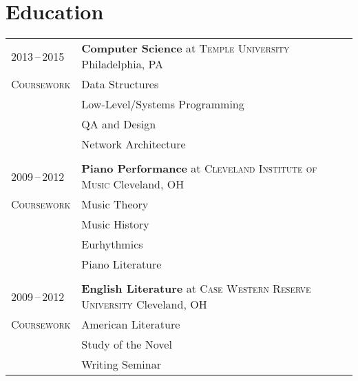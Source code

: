 \documentclass[a4paper,11pt]{article}
\begin{document}

\section{Education}
\begin{tabularx}{\textwidth}{@{}p{6em}|X@{}}
    2013\,--\,2015 & \textbf{Computer Science} at \textsc{Temple University} \hfill Philadelphia, PA \\
    \textsc{Coursework} & \footnotesize Data Structures \\
    & \footnotesize Low-Level/Systems Programming \\
    & \footnotesize QA and Design \\
    & \footnotesize Network Architecture \\
    \multicolumn{2}{c}{} \\

    2009\,--\,2012 & \textbf{Piano Performance} at \textsc{Cleveland Institute of Music} \hfill Cleveland, OH \\
    \textsc{Coursework} & \footnotesize Music Theory \\
    & \footnotesize Music History \\
    & \footnotesize Eurhythmics \\
    & \footnotesize Piano Literature \\
    \multicolumn{2}{c}{} \\

    2009\,--\,2012 & \textbf{English Literature} at \textsc{Case Western Reserve University} \hfill Cleveland, OH \\
    \textsc{Coursework} & \footnotesize American Literature \\
    & \footnotesize Study of the Novel \\
    & \footnotesize Writing Seminar
\end{tabularx}
\end{document}
